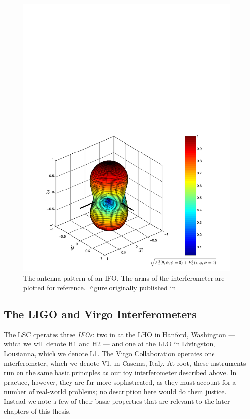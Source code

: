 \begin{figure}[p]
\center
\includegraphics[width=6in]{figures/beampattern.pdf}
\caption{The antenna pattern of an \ac{IFO}. The arms of the interferometer are plotted for reference. Figure originally published in \cite{ref:Brown}.}
\end{figure}

\subsection{The LIGO and Virgo Interferometers}

The \ac{LSC} operates three \emph{\acp{IFO}}: two in at the \ac{LHO} in Hanford, Washington --- which we will denote H1 and H2 --- and one at the \ac{LLO} in Livingston, Lousianna, which we denote L1. The Virgo Collaboration operates one interferometer, which we denote V1, in Cascina, Italy. At root, these instruments run on the same basic principles as our toy interferometer described above. In practice, however, they are far more sophisticated, as they must account for a number of real-world problems; no description here would do them justice. Instead we note a few of their basic properties that are relevant to the later chapters of this thesis.

